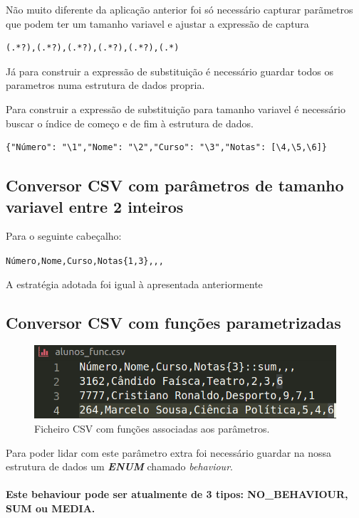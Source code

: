 \documentclass[runningheads]{llncs}
\begin{document}
Não muito diferente da aplicação anterior foi só necessário capturar parãmetros que podem ter um tamanho variavel e ajustar a expressão de captura

\begin{verbatim}
(.*?),(.*?),(.*?),(.*?),(.*?),(.*)    
\end{verbatim}


Já para construir a expressão de substituição é necessário guardar todos os parametros numa estrutura de dados propria.


Para construir a expressão de substituição para tamanho variavel é necessário buscar o índice de começo e de fim à estrutura de dados. 

\begin{verbatim}
{"Número": "\1","Nome": "\2","Curso": "\3","Notas": [\4,\5,\6]}
\end{verbatim}

\subsection{Conversor CSV com parâmetros de tamanho variavel entre 2 inteiros}

Para o seguinte cabeçalho:


\verb|Número,Nome,Curso,Notas{1,3},,,|

A estratégia adotada foi igual à apresentada anteriormente

\newpage

\subsection{Conversor CSV com funções parametrizadas}

\begin{figure}[h]
\centering
\includegraphics[width=\textwidth]{pl03.png}
\caption{Ficheiro CSV com funções associadas aos parâmetros.} \label{fig1}
\end{figure}

Para poder lidar com este parâmetro extra foi necessário guardar na nossa estrutura de dados um \textit{\textbf{ENUM}} chamado \textit{behaviour}.

\paragraph{Este behaviour pode ser atualmente de 3 tipos: \textbf{NO\_BEHAVIOUR, SUM ou MEDIA}.}
\end{document}
